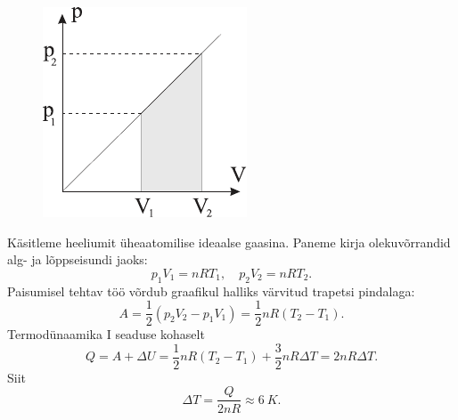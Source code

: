 \documentclass[10pt]{article}
\begin{document}
{%

\solu
\begin{figure}
	\begin{center}
		\vspace{-25pt}
		\includegraphics[width=0.95\linewidth]{2008-lahg-06-lah}
	\end{center}
\end{figure}
Käsitleme heeliumit üheaatomilise ideaalse gaasina. 
Paneme kirja olekuvõrrandid alg- ja lõppseisundi jaoks:
\[
p_1V_1 = nRT_1, \quad p_2V_2 = nRT_2.
\]
Paisumisel tehtav töö võrdub graafikul halliks värvitud
trapetsi pindalaga:
\[
A = \frac 12 (p_2V_2 - p_1V_1) = \frac 12 nR(T_2 - T_1).
\]
Termodünaamika I seaduse kohaselt 
\[
Q = A + \Delta U = \frac 12 nR(T_2 - T_1) + \frac 32 nR\Delta T = 2nR\Delta T.
\]
Siit
\[
\Delta T =\frac {Q}{2nR} \approx \SI{6}{K}.
\]
\probend
\bigskip


}
\end{document}
